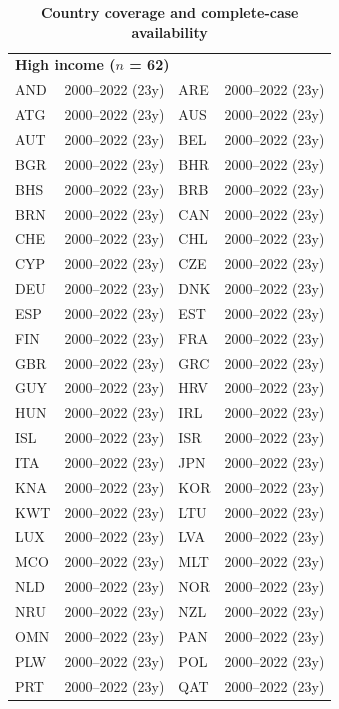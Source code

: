 \documentclass[10pt,a4paper]{article}
\begin{document}
\begin{center}\footnotesize
\begin{longtable}{llll}
\caption{\textbf{Country coverage and complete-case availability}}\label{tab:S2b}\\
\toprule
\multicolumn{4}{l}{\textbf{High income ($n$ = 62)}}\\
AND & 2000--2022 (23y) & ARE & 2000--2022 (23y) \\
ATG & 2000--2022 (23y) & AUS & 2000--2022 (23y) \\
AUT & 2000--2022 (23y) & BEL & 2000--2022 (23y) \\
BGR & 2000--2022 (23y) & BHR & 2000--2022 (23y) \\
BHS & 2000--2022 (23y) & BRB & 2000--2022 (23y) \\
BRN & 2000--2022 (23y) & CAN & 2000--2022 (23y) \\
CHE & 2000--2022 (23y) & CHL & 2000--2022 (23y) \\
CYP & 2000--2022 (23y) & CZE & 2000--2022 (23y) \\
DEU & 2000--2022 (23y) & DNK & 2000--2022 (23y) \\
ESP & 2000--2022 (23y) & EST & 2000--2022 (23y) \\
FIN & 2000--2022 (23y) & FRA & 2000--2022 (23y) \\
GBR & 2000--2022 (23y) & GRC & 2000--2022 (23y) \\
GUY & 2000--2022 (23y) & HRV & 2000--2022 (23y) \\
HUN & 2000--2022 (23y) & IRL & 2000--2022 (23y) \\
ISL & 2000--2022 (23y) & ISR & 2000--2022 (23y) \\
ITA & 2000--2022 (23y) & JPN & 2000--2022 (23y) \\
KNA & 2000--2022 (23y) & KOR & 2000--2022 (23y) \\
KWT & 2000--2022 (23y) & LTU & 2000--2022 (23y) \\
LUX & 2000--2022 (23y) & LVA & 2000--2022 (23y) \\
MCO & 2000--2022 (23y) & MLT & 2000--2022 (23y) \\
NLD & 2000--2022 (23y) & NOR & 2000--2022 (23y) \\
NRU & 2000--2022 (23y) & NZL & 2000--2022 (23y) \\
OMN & 2000--2022 (23y) & PAN & 2000--2022 (23y) \\
PLW & 2000--2022 (23y) & POL & 2000--2022 (23y) \\
PRT & 2000--2022 (23y) & QAT & 2000--2022 (23y) \\

\end{longtable}
\end{center}
\end{document}
